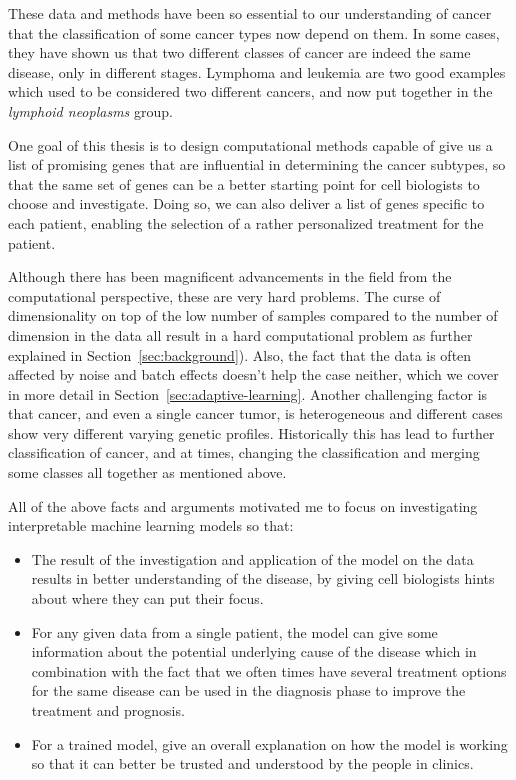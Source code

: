 These data and methods have been so essential to our understanding of cancer
that the classification of some cancer types now depend on them. In some cases,
they have shown us that two different classes of cancer are indeed the same
disease, only in different stages. Lymphoma and leukemia are two good examples
which used to be considered two different cancers, and now put together in the
\emph{lymphoid neoplasms} group.

One goal of this thesis is to design computational methods capable of give us a
list of promising genes that are influential in determining the cancer subtypes,
so that the same set of genes can be a better starting point for cell biologists
to choose and investigate. Doing so, we can also deliver a list of genes
specific to each patient, enabling the selection of a rather personalized
treatment for the patient.

Although there has been magnificent advancements in the field from the
computational perspective, these are very hard problems. The curse of
dimensionality on top of the low number of samples compared to the number of
dimension in the data all result in a hard computational problem as further
explained in Section~\ref{sec:background}). Also, the fact that the data is
often affected by noise and batch effects doesn't help the case neither, which
we cover in more detail in Section~\ref{sec:adaptive-learning}. Another
challenging factor is that cancer, and even a single cancer tumor, is
heterogeneous and different cases show very different varying genetic profiles.
Historically this has lead to further classification of cancer, and at times,
changing the classification and merging some classes all together as mentioned
above.

All of the above facts and arguments motivated me to focus on investigating
interpretable machine learning models so that:
\begin{itemize}
\item The result of the investigation and application of the model on the data
  results in better understanding of the disease, by giving cell biologists
  hints about where they can put their focus.
\item For any given data from a single patient, the model can give some
  information about the potential underlying cause of the disease which in
  combination with the fact that we often times have several treatment options
  for the same disease can be used in the diagnosis phase to improve the
  treatment and prognosis.
\item For a trained model, give an overall explanation on how the model is
  working so that it can better be trusted and understood by the people in
  clinics.
\end{itemize}

